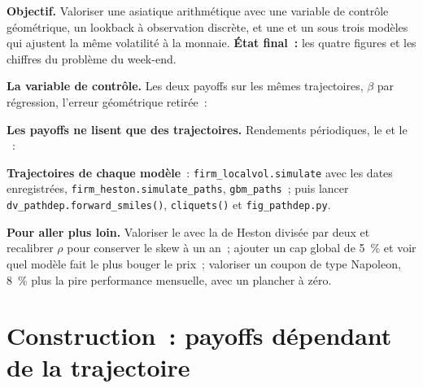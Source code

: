\begin{tutorial}
\textbf{Objectif.} Valoriser une asiatique arithmétique avec une variable de contrôle géométrique, un lookback à observation discrète, et une
 et un  sous trois modèles qui ajustent la même volatilité à la monnaie. \textbf{État final~:} les quatre
figures et les chiffres du problème du week-end.
\begin{tutsteps}
\item \textbf{La variable de contrôle.} Les deux payoffs sur les mêmes trajectoires, $\beta$ par régression, l'erreur géométrique retirée~:
\label{lst:dv:asians-lookbacks-cliquets-and-forward-starts:cv}
\item \textbf{Les payoffs ne lisent que des trajectoires.} Rendements périodiques, le  et le ~:
\label{lst:dv:asians-lookbacks-cliquets-and-forward-starts:cliquet}
\item \textbf{Trajectoires de chaque modèle}~: \texttt{firm\_localvol.simulate} avec les dates enregistrées, \texttt{firm\_heston.simulate\_paths},
\texttt{gbm\_paths}~; puis lancer \texttt{dv\_pathdep.forward\_smiles()}, \texttt{cliquets()} et \texttt{fig\_pathdep.py}.
\end{tutsteps}
\textbf{Pour aller plus loin.} Valoriser le  avec la  de Heston divisée par deux et recalibrer $\rho$ pour conserver le
skew à un an~; ajouter un cap global de 5~\% et voir quel modèle fait le plus bouger le prix~; valoriser un coupon de type Napoleon, 8~\% plus la
pire performance mensuelle, avec un plancher à zéro.
\end{tutorial}

\section{Construction~: payoffs dépendant de la trajectoire}\label{bld:dv:asians-lookbacks-cliquets-and-forward-starts:pathdep}


